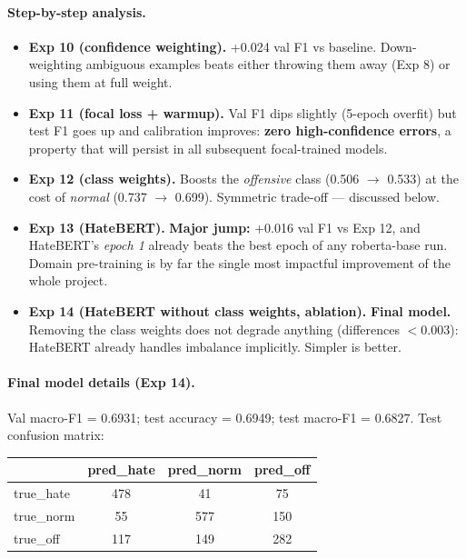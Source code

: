 \documentclass[11pt,a4paper]{article}
\begin{document}
\paragraph{Step-by-step analysis.}
\begin{itemize}[leftmargin=*]
    \item \textbf{Exp 10 (confidence weighting).} +0.024 val F1 vs baseline.
    Down-weighting ambiguous examples beats either throwing them away (Exp 8) or
    using them at full weight.
    \item \textbf{Exp 11 (focal loss + warmup).} Val F1 dips slightly (5-epoch
    overfit) but test F1 goes up and calibration improves: \textbf{zero
    high-confidence errors}, a property that will persist in all subsequent
    focal-trained models.
    \item \textbf{Exp 12 (class weights).} Boosts the \emph{offensive} class
    (0.506 $\to$ 0.533) at the cost of \emph{normal} (0.737 $\to$ 0.699).
    Symmetric trade-off --- discussed below.
    \item \textbf{Exp 13 (HateBERT).} \textbf{Major jump:} +0.016 val F1 vs Exp 12,
    and HateBERT's \emph{epoch 1} already beats the best epoch of any roberta-base
    run. Domain pre-training is by far the single most impactful improvement of
    the whole project.
    \item \textbf{Exp 14 (HateBERT without class weights, ablation).}
    \textbf{Final model.} Removing the class weights does not degrade anything
    (differences $<$0.003): HateBERT already handles imbalance implicitly.
    Simpler is better.
\end{itemize}

\paragraph{Final model details (Exp 14).}
Val macro-F1 = 0.6931; test accuracy = 0.6949; test macro-F1 = 0.6827.
Test confusion matrix:

\begin{center}\small
\begin{tabular}{l|ccc}
\toprule
              & pred\_hate & pred\_norm & pred\_off \\
\midrule
true\_hate    & 478 & 41  & 75  \\
true\_norm    & 55  & 577 & 150 \\
true\_off     & 117 & 149 & 282 \\
\bottomrule
\end{tabular}
\end{center}
\end{document}
